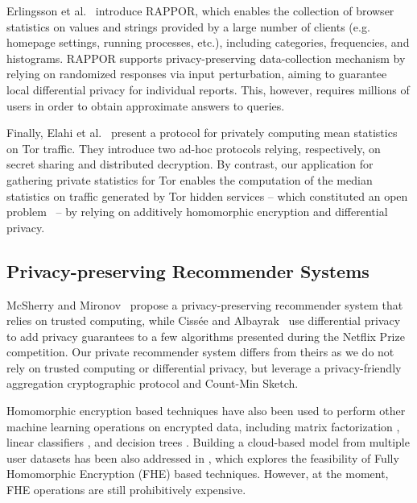 \documentclass[conference]{IEEEtran}
\begin{document}
Erlingsson et al.~\cite{erlingsson2014rappor} introduce RAPPOR, which enables the collection of browser statistics on values and strings provided by a large number of clients (e.g. homepage settings, running processes, etc.), including categories, frequencies, and histograms.
RAPPOR supports privacy-preserving data-collection mechanism by relying on randomized responses via input perturbation, aiming to guarantee local differential privacy for  individual reports.
This, however, requires millions of users in order to obtain approximate answers to queries.


Finally, Elahi et al.~\cite{elahi2014privex} present a protocol for privately computing mean statistics on Tor traffic.
They introduce two ad-hoc protocols relying, respectively, on secret sharing and distributed decryption. By contrast, our application for gathering private statistics for Tor enables the computation of the median statistics on traffic generated by Tor hidden services -- which constituted an open problem~\cite{goulethidden} -- by relying on additively homomorphic encryption and differential privacy. 


\subsection{Privacy-preserving Recommender Systems}
McSherry and Mironov~\cite{mcsherry2009differentially} propose a privacy-preserving recommender system that relies on trusted computing, while Ciss{\'e}e and Albayrak~\cite{cissee2007agent} use differential privacy to add privacy guarantees to a few algorithms presented during the Netflix Prize competition.
Our private recommender system differs from theirs as we do not rely on trusted computing or differential privacy, but leverage a privacy-friendly aggregation cryptographic protocol and Count-Min Sketch.


Homomorphic encryption based techniques have also been used to perform other machine learning operations on encrypted data, including matrix factorization \cite{nikolaenko2013privacy}, linear classifiers \cite{bos2014private,graepel2013ml}, and decision trees \cite{bost2014machine}. 
Building a cloud-based model from multiple user datasets has been also addressed in \cite{lopez2012fly}, which explores the feasibility of Fully Homomorphic Encryption (FHE) based techniques.
However, at the moment, FHE operations are still prohibitively expensive. 
\end{document}
